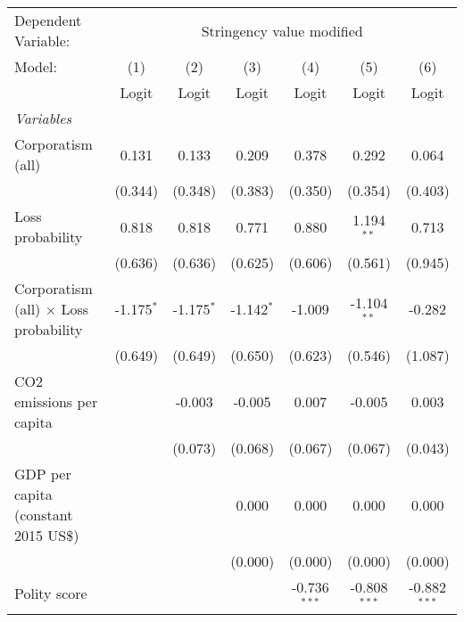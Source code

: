 
\begingroup
\centering
\begin{tabular}{lcccccc}
   \toprule
   Dependent Variable: & \multicolumn{6}{c}{Stringency value modified}\\
   Model:                                       & (1)          & (2)          & (3)          & (4)            & (5)            & (6)\\  
                                                &  Logit       & Logit        & Logit        & Logit          & Logit          & Logit\\  
   \midrule
   \emph{Variables}\\
   Corporatism (all)                            & 0.131        & 0.133        & 0.209        & 0.378          & 0.292          & 0.064\\   
                                                & (0.344)      & (0.348)      & (0.383)      & (0.350)        & (0.354)        & (0.403)\\   
   Loss probability                             & 0.818        & 0.818        & 0.771        & 0.880          & 1.194$^{**}$   & 0.713\\   
                                                & (0.636)      & (0.636)      & (0.625)      & (0.606)        & (0.561)        & (0.945)\\   
   Corporatism (all) $\times$ Loss probability  & -1.175$^{*}$ & -1.175$^{*}$ & -1.142$^{*}$ & -1.009         & -1.104$^{**}$  & -0.282\\   
                                                & (0.649)      & (0.649)      & (0.650)      & (0.623)        & (0.546)        & (1.087)\\   
   CO2 emissions per capita                     &              & -0.003       & -0.005       & 0.007          & -0.005         & 0.003\\   
                                                &              & (0.073)      & (0.068)      & (0.067)        & (0.067)        & (0.043)\\   
   GDP per capita (constant 2015 US\$)          &              &              & 0.000        & 0.000          & 0.000          & 0.000\\   
                                                &              &              & (0.000)      & (0.000)        & (0.000)        & (0.000)\\   
   Polity score                                 &              &              &              & -0.736$^{***}$ & -0.808$^{***}$ & -0.882$^{***}$\\   

\end{tabular}
